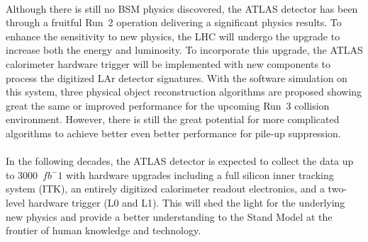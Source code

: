 \\Although there is still no BSM physics discovered, the ATLAS detector has been through a fruitful Run~2 operation delivering a significant physics results. To enhance the sensitivity to new physics, the LHC will undergo the upgrade to increase both the energy and luminosity. To incorporate this upgrade, the ATLAS calorimeter hardware trigger will be implemented with new components to process the digitized LAr detector signatures. With the software simulation on this system, three physical object reconstruction algorithms are proposed showing great the same or improved performance for the upcoming Run~3 collision environment. However, there is still the great potential for more complicated algorithms to achieve better even better performance for pile-up suppression. 
\\
\\In the following decades, the ATLAS detector is expected to collect the data up to 3000~$fb^-1$ with hardware upgrades including a full silicon inner tracking system (ITK), an entirely digitized calorimeter readout electronics, and a two-level hardware trigger (L0 and L1). This will shed the light for the underlying new physics and provide a better understanding to the Stand Model at the frontier of human knowledge and technology. 
\newpage
{}